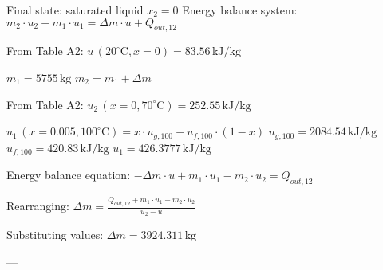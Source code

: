 Final state: saturated liquid \( x_2 = 0 \)  
Energy balance system:  
\( m_2 \cdot u_2 - m_1 \cdot u_1 = \Delta m \cdot u + Q_{out,12} \)  

From Table A2:  
\( u \, (20^\circ \text{C}, x = 0) = 83.56 \, \text{kJ/kg} \)  

\( m_1 = 5755 \, \text{kg} \)  
\( m_2 = m_1 + \Delta m \)  

From Table A2:  
\( u_2 \, (x = 0, 70^\circ \text{C}) = 252.55 \, \text{kJ/kg} \)  

\( u_1 \, (x = 0.005, 100^\circ \text{C}) = x \cdot u_{g,100} + u_{f,100} \cdot (1 - x) \)  
\( u_{g,100} = 2084.54 \, \text{kJ/kg} \)  
\( u_{f,100} = 420.83 \, \text{kJ/kg} \)  
\( u_1 = 426.3777 \, \text{kJ/kg} \)  

Energy balance equation:  
\( -\Delta m \cdot u + m_1 \cdot u_1 - m_2 \cdot u_2 = Q_{out,12} \)  

Rearranging:  
\( \Delta m = \frac{Q_{out,12} + m_1 \cdot u_1 - m_2 \cdot u_2}{u_2 - u} \)  

Substituting values:  
\( \Delta m = 3924.311 \, \text{kg} \)  

---